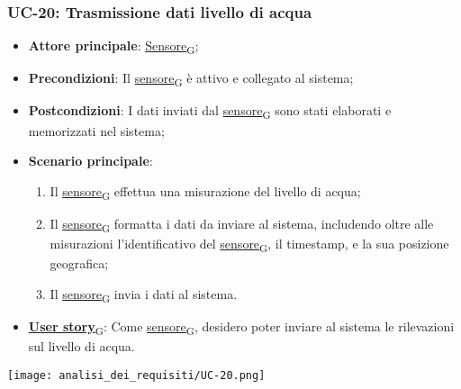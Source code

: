 \subsubsection{UC-20: Trasmissione dati livello di acqua}
\begin{itemize}
	\item \textbf{Attore principale}: \href{https://7last.github.io/docs/rtb/documentazione-interna/glossario\#sensore}{Sensore\textsubscript{G}};
	\item \textbf{Precondizioni}: Il \href{https://7last.github.io/docs/rtb/documentazione-interna/glossario\#sensore}{sensore\textsubscript{G}} è attivo e collegato al sistema;
	\item \textbf{Postcondizioni}: I dati inviati dal \href{https://7last.github.io/docs/rtb/documentazione-interna/glossario\#sensore}{sensore\textsubscript{G}} sono stati elaborati e memorizzati nel sistema;
	\item \textbf{Scenario principale}:
	      \begin{enumerate}
		      \item Il \href{https://7last.github.io/docs/rtb/documentazione-interna/glossario\#sensore}{sensore\textsubscript{G}} effettua una misurazione del livello di acqua;
		      \item Il \href{https://7last.github.io/docs/rtb/documentazione-interna/glossario\#sensore}{sensore\textsubscript{G}} formatta i dati da inviare al sistema, includendo oltre alle misurazioni l'identificativo del \href{https://7last.github.io/docs/rtb/documentazione-interna/glossario\#sensore}{sensore\textsubscript{G}},
		            il timestamp, e la sua posizione geografica;
		      \item Il \href{https://7last.github.io/docs/rtb/documentazione-interna/glossario\#sensore}{sensore\textsubscript{G}} invia i dati al sistema.
	      \end{enumerate}
	\item \href{https://7last.github.io/docs/rtb/documentazione-interna/glossario\#user-story}{\textbf{User story}\textsubscript{G}}: Come \href{https://7last.github.io/docs/rtb/documentazione-interna/glossario\#sensore}{sensore\textsubscript{G}}, desidero poter inviare al sistema le rilevazioni sul livello di acqua.
\end{itemize}

\begin{center}
	\texttt{[image: analisi\_dei\_requisiti/UC-20.png]}
\end{center}

